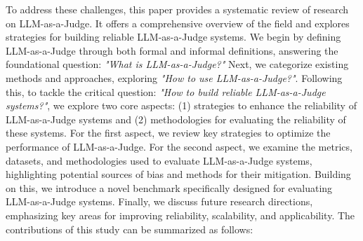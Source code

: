 \documentclass[acmsmall,screen]{acmart}
\begin{document}
To address these challenges, this paper provides a systematic review of research on LLM-as-a-Judge. It offers a comprehensive overview of the field and explores strategies for building reliable LLM-as-a-Judge systems. We begin by defining LLM-as-a-Judge through both formal and informal definitions, answering the foundational question: \textit{"What is LLM-as-a-Judge?"} Next, we categorize existing methods and approaches, exploring \textit{"How to use LLM-as-a-Judge?"}.
Following this, to tackle the critical question: \textit{"How to build reliable LLM-as-a-Judge systems?"}, we explore two core aspects: (1) strategies to enhance the reliability of LLM-as-a-Judge systems and (2) methodologies for evaluating the reliability of these systems.
For the first aspect, we review key strategies to optimize the performance of LLM-as-a-Judge. For the second aspect, we examine the metrics, datasets, and methodologies used to evaluate LLM-as-a-Judge systems, highlighting potential sources of bias and methods for their mitigation.
Building on this, we introduce a novel benchmark specifically designed for evaluating LLM-as-a-Judge systems. Finally, we discuss future research directions, emphasizing key areas for improving reliability, scalability, and applicability. The contributions of this study can be summarized as follows:
\end{document}
